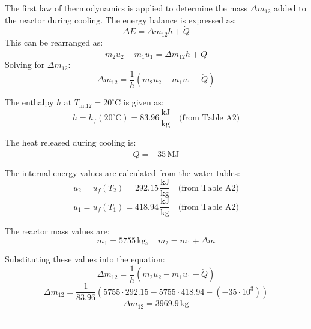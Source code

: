 The first law of thermodynamics is applied to determine the mass \( \Delta m_{12} \) added to the reactor during cooling. The energy balance is expressed as:  
\[
\Delta E = \Delta m_{12} h + \dot{Q}
\]  
This can be rearranged as:  
\[
m_2 u_2 - m_1 u_1 = \Delta m_{12} h + \dot{Q}
\]  
Solving for \( \Delta m_{12} \):  
\[
\Delta m_{12} = \frac{1}{h} (m_2 u_2 - m_1 u_1 - \dot{Q})
\]  

The enthalpy \( h \) at \( T_{\text{in,12}} = 20^\circ\text{C} \) is given as:  
\[
h = h_f(20^\circ\text{C}) = 83.96 \, \frac{\text{kJ}}{\text{kg}} \quad \text{(from Table A2)}
\]  

The heat released during cooling is:  
\[
\dot{Q} = -35 \, \text{MJ}
\]  

The internal energy values are calculated from the water tables:  
\[
u_2 = u_f(T_2) = 292.15 \, \frac{\text{kJ}}{\text{kg}} \quad \text{(from Table A2)}
\]  
\[
u_1 = u_f(T_1) = 418.94 \, \frac{\text{kJ}}{\text{kg}} \quad \text{(from Table A2)}
\]  

The reactor mass values are:  
\[
m_1 = 5755 \, \text{kg}, \quad m_2 = m_1 + \Delta m
\]  

Substituting these values into the equation:  
\[
\Delta m_{12} = \frac{1}{h} \left( m_2 u_2 - m_1 u_1 - \dot{Q} \right)
\]  
\[
\Delta m_{12} = \frac{1}{83.96} \left( 5755 \cdot 292.15 - 5755 \cdot 418.94 - (-35 \cdot 10^3) \right)
\]  
\[
\Delta m_{12} = 3969.9 \, \text{kg}
\]  

---